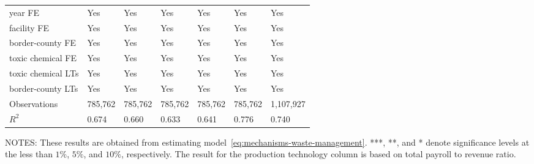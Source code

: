 \begin{table}[H]
{\begin{tabular}{@{}lllllll@{}}
            year FE                           & Yes      & Yes        & Yes      & Yes      & Yes       & Yes       \\
            facility FE                       & Yes      & Yes        & Yes      & Yes      & Yes       & Yes       \\
            border-county FE                  & Yes      & Yes        & Yes      & Yes      & Yes       & Yes       \\
            toxic chemical FE                 & Yes      & Yes        & Yes      & Yes      & Yes       & Yes       \\
            toxic chemical LTs                & Yes      & Yes        & Yes      & Yes      & Yes       & Yes       \\
            border-county LTs                 & Yes      & Yes        & Yes      & Yes      & Yes       & Yes       \\ \midrule
            Observations                      & 785,762  & 785,762    & 785,762  & 785,762  & 785,762   & 1,107,927 \\
            $R^2$                             & 0.674    & 0.660      & 0.633    & 0.641    & 0.776     & 0.740     \\ \bottomrule \bottomrule
        \end{tabular}%
    }
    \begin{minipage}{\columnwidth}
        \vspace{0.05in}
        \tiny NOTES: These results are obtained from estimating model~\ref{eq:mechanisms-waste-management}. ***, **, and * denote significance levels at the less than $1\%$, $5\%$, and $10\%$, respectively. The result for the production technology column is based on total payroll to revenue ratio.
    \end{minipage}
\end{table}